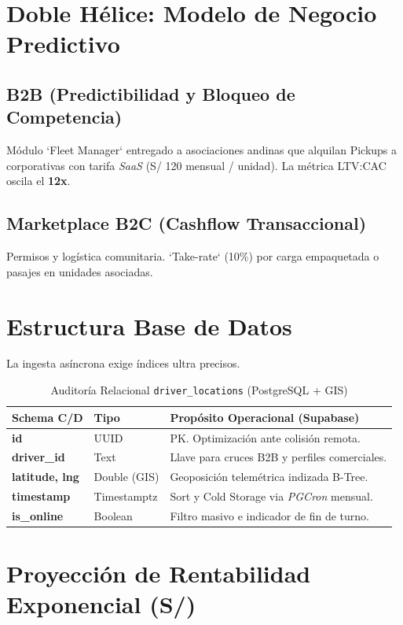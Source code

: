 \documentclass[11pt,a4paper,table]{article}
\begin{document}
\section{Doble Hélice: Modelo de Negocio Predictivo}
\subsection{B2B (Predictibilidad y Bloqueo de Competencia)}
Módulo `Fleet Manager` entregado a asociaciones andinas que alquilan Pickups a corporativas con tarifa \textit{SaaS} (S/ 120 mensual / unidad). La métrica LTV:CAC oscila el \textbf{12x}.

\subsection{Marketplace B2C (Cashflow Transaccional)}
Permisos y logística comunitaria. `Take-rate` (10\%) por carga empaquetada o pasajes en unidades asociadas.

\section{Estructura Base de Datos}
La ingesta asíncrona exige índices ultra precisos.

\begin{table}[htbp]
\centering
\caption{Auditoría Relacional \texttt{driver\_locations} (PostgreSQL + GIS)}
\begin{tabularx}{\textwidth}{>{\bfseries}l l X}
\toprule
Schema C/D & Tipo & Propósito Operacional (Supabase) \\
\midrule
id & UUID & PK. Optimización ante colisión remota. \\
driver\_id & Text & Llave para cruces B2B y perfiles comerciales. \\
latitude, lng & Double (GIS) & Geoposición telemétrica indizada B-Tree. \\
timestamp & Timestamptz & Sort y Cold Storage via \textit{PGCron} mensual. \\
is\_online & Boolean & Filtro masivo e indicador de fin de turno. \\
\bottomrule
\end{tabularx}
\end{table}

\section{Proyección de Rentabilidad Exponencial (S/)}
\end{document}
